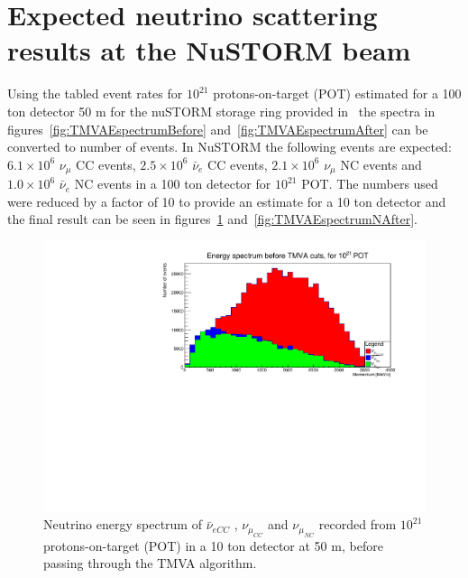 \section{Expected neutrino scattering results at the NuSTORM beam}

Using the tabled event rates for $10^{21}$ protons-on-target (POT) estimated for a 100 ton detector 50 m for the nuSTORM storage ring provided in~\cite{118Soler} the spectra in figures~\ref{fig:TMVAEspectrumBefore} and~\ref{fig:TMVAEspectrumAfter} can be converted to number of events. In NuSTORM the following events are expected: $6.1\times 10^6$ $\nu_\mu$ CC events, $2.5\times 10^6$ $\bar{\nu}_e$ CC events, $2.1\times 10^6$ $\nu_\mu$ NC events and $1.0\times 10^6$ $\bar{\nu}_e$ NC events in a 100 ton detector for $10^{21}$ POT. The numbers used were reduced by a factor of 10 to provide an estimate for a 10 ton detector and the final result can be seen in figures~\ref{fig:TMVAEspectrumNBefore} and~\ref{fig:TMVAEspectrumNAfter}.

\begin{figure}[h!]
\centering
\includegraphics[width=.9\textwidth]{figures/NeutrinoChap/NuSTORM/ActualNumEvents.pdf}
\caption{Neutrino energy spectrum of $\bar{\nu}_{eCC}$ , $\nu_{\mu_{CC}}$ and $\nu_{\mu_{NC}}$ recorded from $10^{21}$ protons-on-target (POT) in a 10 ton detector at 50 m, before passing through the TMVA algorithm.}
\label{fig:TMVAEspectrumNBefore}
\end{figure}

